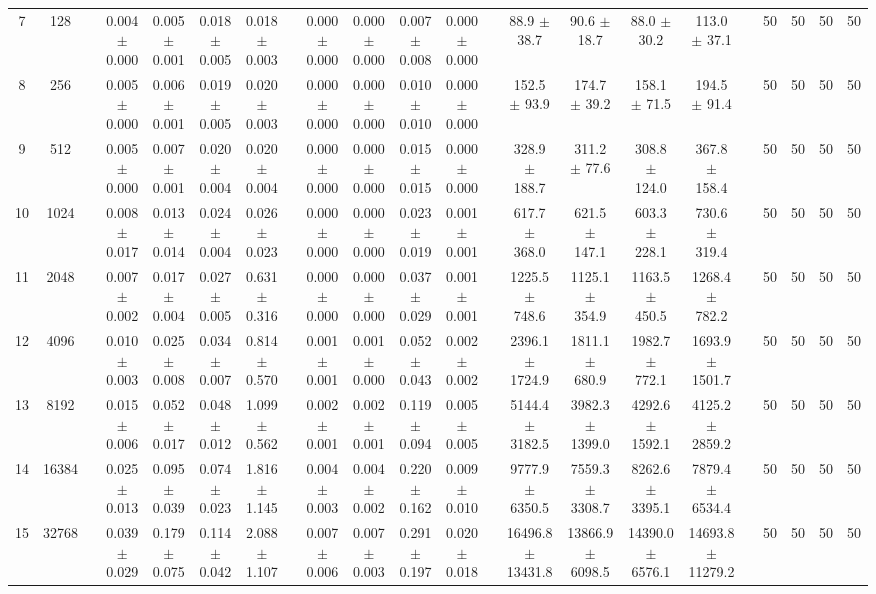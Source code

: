 \documentclass[11pt]{article}
\begin{document}
\begin{landscape}
\begin{table}
\begin{tabular}{cccccccccccccccccccccc}
 7 &     128 &&  0.004 $\pm$ 0.000 & 0.005 $\pm$ 0.001 & 0.018 $\pm$ 0.005 & 0.018 $\pm$ 0.003 &&  0.000 $\pm$ 0.000 & 0.000 $\pm$ 0.000 & 0.007 $\pm$ 0.008 & 0.000 $\pm$ 0.000 &&  88.9 $\pm$ 38.7 & 90.6 $\pm$ 18.7 & 88.0 $\pm$ 30.2 & 113.0 $\pm$ 37.1 && 50& 50& 50& 50\\
 8 &     256 &&  0.005 $\pm$ 0.000 & 0.006 $\pm$ 0.001 & 0.019 $\pm$ 0.005 & 0.020 $\pm$ 0.003 &&  0.000 $\pm$ 0.000 & 0.000 $\pm$ 0.000 & 0.010 $\pm$ 0.010 & 0.000 $\pm$ 0.000 &&  152.5 $\pm$ 93.9 & 174.7 $\pm$ 39.2 & 158.1 $\pm$ 71.5 & 194.5 $\pm$ 91.4 && 50& 50& 50& 50\\
 9 &     512 &&  0.005 $\pm$ 0.000 & 0.007 $\pm$ 0.001 & 0.020 $\pm$ 0.004 & 0.020 $\pm$ 0.004 &&  0.000 $\pm$ 0.000 & 0.000 $\pm$ 0.000 & 0.015 $\pm$ 0.015 & 0.000 $\pm$ 0.000 &&  328.9 $\pm$ 188.7 & 311.2 $\pm$ 77.6 & 308.8 $\pm$ 124.0 & 367.8 $\pm$ 158.4 && 50& 50& 50& 50\\
10 &    1024 &&  0.008 $\pm$ 0.017 & 0.013 $\pm$ 0.014 & 0.024 $\pm$ 0.004 & 0.026 $\pm$ 0.023 &&  0.000 $\pm$ 0.000 & 0.000 $\pm$ 0.000 & 0.023 $\pm$ 0.019 & 0.001 $\pm$ 0.001 &&  617.7 $\pm$ 368.0 & 621.5 $\pm$ 147.1 & 603.3 $\pm$ 228.1 & 730.6 $\pm$ 319.4 && 50& 50& 50& 50\\
11 &    2048 &&  0.007 $\pm$ 0.002 & 0.017 $\pm$ 0.004 & 0.027 $\pm$ 0.005 & 0.631 $\pm$ 0.316 &&  0.000 $\pm$ 0.000 & 0.000 $\pm$ 0.000 & 0.037 $\pm$ 0.029 & 0.001 $\pm$ 0.001 &&  1225.5 $\pm$ 748.6 & 1125.1 $\pm$ 354.9 & 1163.5 $\pm$ 450.5 & 1268.4 $\pm$ 782.2 && 50& 50& 50& 50\\
12 &    4096 &&  0.010 $\pm$ 0.003 & 0.025 $\pm$ 0.008 & 0.034 $\pm$ 0.007 & 0.814 $\pm$ 0.570 &&  0.001 $\pm$ 0.001 & 0.001 $\pm$ 0.000 & 0.052 $\pm$ 0.043 & 0.002 $\pm$ 0.002 &&  2396.1 $\pm$ 1724.9 & 1811.1 $\pm$ 680.9 & 1982.7 $\pm$ 772.1 & 1693.9 $\pm$ 1501.7 && 50& 50& 50& 50\\
13 &    8192 &&  0.015 $\pm$ 0.006 & 0.052 $\pm$ 0.017 & 0.048 $\pm$ 0.012 & 1.099 $\pm$ 0.562 &&  0.002 $\pm$ 0.001 & 0.002 $\pm$ 0.001 & 0.119 $\pm$ 0.094 & 0.005 $\pm$ 0.005 &&  5144.4 $\pm$ 3182.5 & 3982.3 $\pm$ 1399.0 & 4292.6 $\pm$ 1592.1 & 4125.2 $\pm$ 2859.2 && 50& 50& 50& 50\\
14 &   16384 &&  0.025 $\pm$ 0.013 & 0.095 $\pm$ 0.039 & 0.074 $\pm$ 0.023 & 1.816 $\pm$ 1.145 &&  0.004 $\pm$ 0.003 & 0.004 $\pm$ 0.002 & 0.220 $\pm$ 0.162 & 0.009 $\pm$ 0.010 &&  9777.9 $\pm$ 6350.5 & 7559.3 $\pm$ 3308.7 & 8262.6 $\pm$ 3395.1 & 7879.4 $\pm$ 6534.4 && 50& 50& 50& 50\\
15 &   32768 &&  0.039 $\pm$ 0.029 & 0.179 $\pm$ 0.075 & 0.114 $\pm$ 0.042 & 2.088 $\pm$ 1.107 &&  0.007 $\pm$ 0.006 & 0.007 $\pm$ 0.003 & 0.291 $\pm$ 0.197 & 0.020 $\pm$ 0.018 &&  16496.8 $\pm$ 13431.8 & 13866.9 $\pm$ 6098.5 & 14390.0 $\pm$ 6576.1 & 14693.8 $\pm$ 11279.2 && 50& 50& 50& 50\\

\end{tabular}
\end{table}
\end{landscape}
\end{document}

